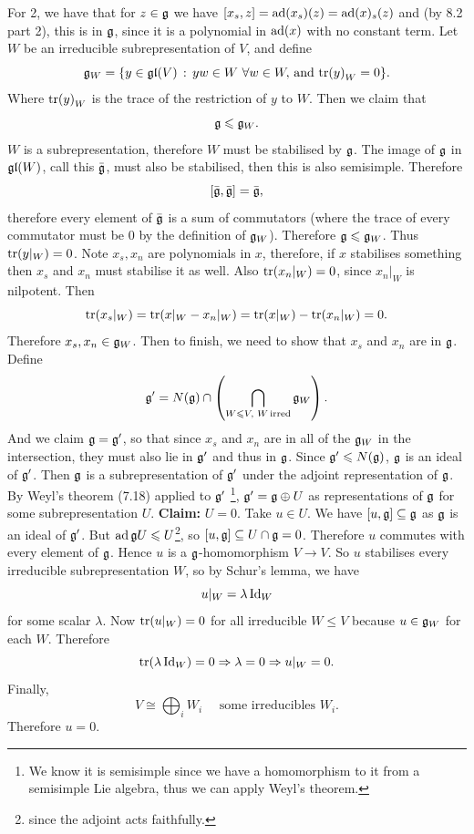 \documentclass{article}
\begin{document}
 For 2, we have that for $z \in \mathfrak{g}$ we have $[x_{s},z] = \operatorname{ad}(x_{s})(z) = \operatorname{ad}(x)_{s}(z)$ and (by 8.2 part 2), this is in $\mathfrak{g}$, since it is a polynomial in $\operatorname{ad}(x)$ with no constant term. 
 \gap Let $W$ be an irreducible subrepresentation of $V$, and define \[ \mathfrak{g}_{W}=\{y \in \mathfrak{gl}(V) \, : \, yw \in W \, \, \forall w \in W, \, \text{and} \, \tr(y)_{W}=0 \}. \]
Where $\tr(y)_{W}$ is the trace of the restriction of $y$ to $W$. Then we claim that \[ \mathfrak{g} \leqslant \mathfrak{g}_{W}.\]
$W$ is a subrepresentation, therefore $W$ must be stabilised by $\mathfrak{g}$. The image of $\mathfrak{g}$ in $\mathfrak{gl}(W)$, call this $\bar {\mathfrak{g}}$, must also be stabilised, then this is also semisimple.\gap
Therefore \[ [\bar {\mathfrak{g}}, \bar {\mathfrak{g}}] = \bar {\mathfrak{g}}, \] therefore every element of $\bar {\mathfrak{g}}$ is a sum of commutators (where the trace of every commutator must be $0$ by the definition of $\mathfrak{g}_{W}$). Therefore $\mathfrak{g} \leqslant \mathfrak{g}_{W}$. 
Thus $\tr(y|_{W})=0$. Note $x_{s},x_{n}$ are polynomials in $x$, therefore, if $x$ stabilises something then $x_{s}$ and $x_{n}$ must stabilise it as well. Also $\tr(x_{n}|_{W}) = 0$, since $x_{n}|_{W}$ is nilpotent. Then \[ \tr(x_{s}|_{W}) = \tr(x|_{W}- x_{n}|_{W}) = \tr(x|_{W}) - \tr(x_{n}|_{W}) = 0. \] Therefore $x_{s},x_{n} \in \mathfrak{g}_{W}$.
\gap Then to finish, we need to show that $x_{s}$ and $x_{n}$ are in $\mathfrak{g}$. Define \[ \mathfrak{g}' = N(\mathfrak{g}) \cap \left( \bigcap_{W\leqslant V,\,\, W \,\text{irred}} \mathfrak{g}_{W} \right). \]
And we claim $\mathfrak{g} = \mathfrak{g}'$, so that since $x_{s}$ and $x_{n}$ are in all of the $\mathfrak{g}_{W}$ in the intersection, they must also lie in $\mathfrak{g}'$ and thus in $\mathfrak{g}$. \gap
Since $\mathfrak{g}' \leqslant N(\mathfrak{g})$, $\mathfrak{g}$ is an ideal of $\mathfrak{g}'$. Then $\mathfrak{g}$ is a subrepresentation of $\mathfrak{g}'$ under the adjoint representation of $\mathfrak{g}$. By Weyl's theorem (7.18) applied to $\mathfrak{g}'$ \footnote{We know it is semisimple since we have a homomorphism to it from a semisimple Lie algebra, thus we can apply Weyl's theorem.}, $\mathfrak{g}' = \mathfrak{g} \oplus U$ as representations of $\mathfrak{g}$ for some subrepresentation $U$. \gap
\textbf{Claim:} $U=0$. Take $u \in U$. We have $[u,\mathfrak{g}] \subseteq \mathfrak{g}$ as $\mathfrak{g}$ is an ideal of $\mathfrak{g}'$. But $\operatorname{ad} \mathfrak{g} U \leqslant U$\footnote{since the adjoint acts faithfully.}, so $[u,\mathfrak{g}] \subseteq U \cap \mathfrak{g} = 0$. \gap Therefore $u$ commutes with every element of $\mathfrak{g}$. Hence $u$ is a $\mathfrak{g}$-homomorphism $V \to V$. So $u$ stabilises every irreducible subrepresentation $W$, so by Schur's lemma, we have \[ u|_{W} = \lambda \operatorname{Id}_{W} \] for some scalar $\lambda$. Now $\tr(u|_{W})=0$ for all irreducible $W \leq V$ because $u \in \mathfrak{g}_{W}$ for each $W$. Therefore \[ \tr(\lambda \operatorname{Id}_{W}) = 0 \Rightarrow \lambda = 0 \Rightarrow u|_{W}=0.\] Finally, \[V \cong \bigoplus_{i} W_{i} \, \, \, \, \, \, \text{   some irreducibles $W_{i}$.}\] Therefore $u=0$.
\end{document}
